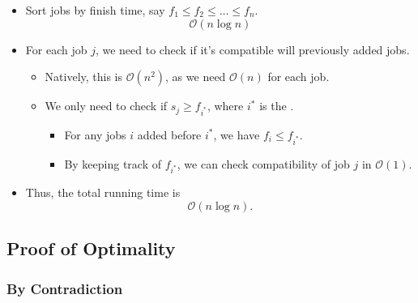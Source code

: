 \begin{itemize}
    \item Sort jobs by finish time, say $f_1 \le f_2 \le \dots \le f_n$. \[
        \mathcal{O}(n \log n)
    \]

    \item For each job $j$, we need to check if it's compatible will  previously added jobs.

    \begin{itemize}
        \item Natively, this is $\mathcal{O}(n^2)$, as we need $\mathcal{O}(n)$ for each job.
        \item We only need to check if $s_j \ge f_{i^*}$, where $i^*$ is the .
        \begin{itemize}
            \item For any jobs $i$ added before $i^*$, we have $f_i \le f_{i^*}$.
            \item By keeping track of $f_{i^*}$, we can check compatibility of job $j$ in $\mathcal{O}(1)$.
        \end{itemize}
    \end{itemize}

    \item Thus, the total running time is \[
        \mathcal{O}(n \log n).
    \]
\end{itemize}

\subsection{Proof of Optimality}

\subsubsection{By Contradiction}


